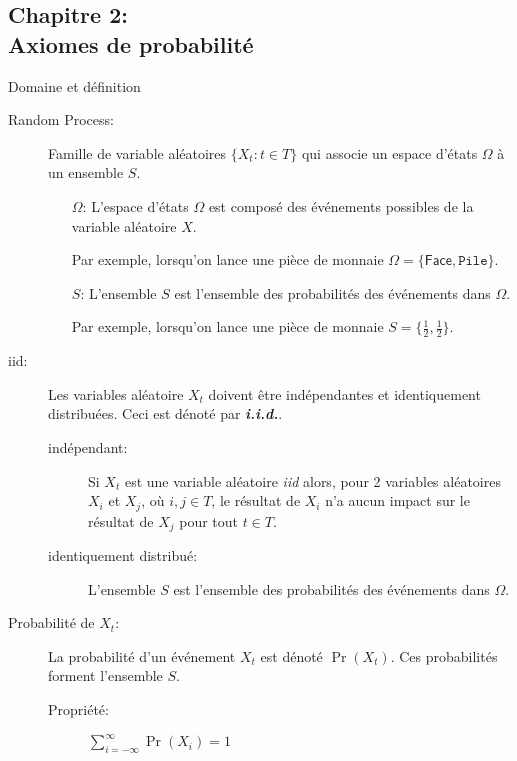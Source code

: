 \documentclass[10pt, french]{article}
\begin{document}
\begin{multicols*}{2}
\pagebreak
\section{Chapitre 2:\\ Axiomes de probabilité}
\begin{rappel}{Domaine et définition}
\begin{description}
	\item[Random Process:]	Famille de variable aléatoires $\{X_{t}: t \in T\}$ qui associe un espace d'états $\Omega$ à un ensemble $S$.
	\begin{enumerate}
		\item[$\Omega$: ] L'espace d'états $\Omega$ est composé des événements possibles de la variable aléatoire $X$.
		\item[] Par exemple, lorsqu'on lance une pièce de monnaie $\Omega = \{\textsf{Face}, \texttt{Pile} \}$.
		\item[$S$: ] L'ensemble $S$ est l'ensemble des probabilités des événements dans $\Omega$.
		\item[] Par exemple, lorsqu'on lance une pièce de monnaie $S = \{\frac{1}{2}, \frac{1}{2} \}$.
	\end{enumerate}
\end{description}
\begin{description}
	\item[iid: ]	Les variables aléatoire $X_{t}$ doivent être indépendantes et identiquement distribuées. Ceci est dénoté par \textit{\textbf{i.i.d.}}.				
	\begin{description}
		\item[indépendant: ] Si $X_{t}$ est une variable aléatoire \textit{iid} alors, pour 2 variables aléatoires $X_{i}$ et $X_{j}$, où $i, j \in T$, le résultat de $X_{i}$ n'a aucun impact sur le résultat de $X_{j}$ pour tout $t \in T$.
		\item[identiquement distribué: ] L'ensemble $S$ est l'ensemble des probabilités des événements dans $\Omega$.
	\end{description}
	\item[Probabilité de $X_{t}$: ]	La probabilité d'un événement $X_{t}$ est dénoté $\Pr(X_{t})$. 
	Ces probabilités forment l'ensemble $S$.
	\begin{description}
		\item[Propriété: ] $\sum_{i = -\infty}^{\infty} \Pr(X_{i}) = 1$
	\end{description}

\end{description}
\end{rappel}
\end{multicols*}
\end{document}
